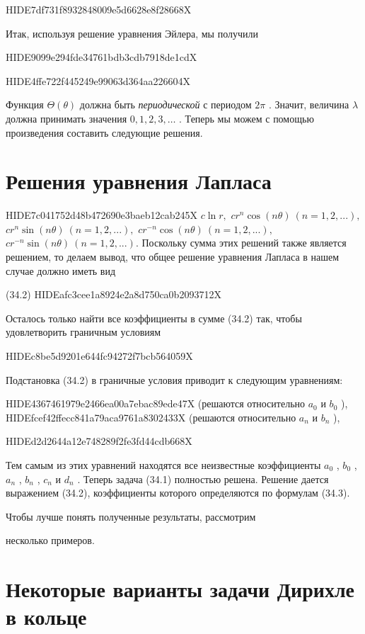 \documentclass[
  ukrainian,
]{article}
\begin{document}
HIDE7df731f8932848009e5d6628e8f28668X

Итак, используя решение уравнения Эйлера, мы получили

HIDE9099e294fde34761bdb3cdb7918de1cdX

HIDE4ffe722f445249e99063d364aa226604X

Функция \(\Theta(\theta)\) должна быть \emph{периодической} с периодом
\(2\pi\) . Значит, величина \(\lambda\) должна принимать значения
\(0, 1, 2, 3, \ldots\) . Теперь мы можем с помощью произведения
составить следующие решения.

\section{Решения уравнения
Лапласа}\label{ux440ux435ux448ux435ux43dux438ux44f-ux443ux440ux430ux432ux43dux435ux43dux438ux44f-ux43bux430ux43fux43bux430ux441ux430}

HIDE7c041752d48b472690e3baeb12cab245X \(c \ln r,\)
\(cr^n \cos(n\theta) \ (n = 1, 2, ...),\)
\(cr^n \sin(n\theta) \ (n = 1, 2, ...),\)
\(cr^{-n} \cos(n\theta) \ (n = 1, 2, ...),\)
\(cr^{-n} \sin(n\theta) \ (n = 1, 2, ...).\) Поскольку сумма этих
решений также является решением, то делаем вывод, что общее решение
уравнения Лапласа в нашем случае должно иметь вид

(34.2) HIDEafc3cee1a8924e2a8d750ca0b2093712X

Осталось только найти все коэффициенты в сумме (34.2) так, чтобы
удовлетворить граничным условиям

HIDEc8be5d9201e644fc94272f7bcb564059X

Подстановка (34.2) в граничные условия приводит к следующим уравнениям:

HIDE4367461979e2466ea00a7ebac89ede47X (решаются относительно \(a_0\) и
\(b_0\) ), HIDEfcef42ffecc841a79aca9761a8302433X (решаются относительно
\(a_n\) и \(b_n\) ),

HIDEd2d2644a12e748289f2fe3fd44cdb668X

Тем самым из этих уравнений находятся все неизвестные коэффициенты
\(a_0\) , \(b_0\) , \(a_n\) , \(b_n\) , \(c_n\) и \(d_n\) . Теперь
задача (34.1) полностью решена. Решение дается выражением (34.2),
коэффициенты которого определяются по формулам (34.3).

Чтобы лучше понять полученные результаты, рассмотрим

несколько примеров.

\section{Некоторые варианты задачи Дирихле в
кольце}\label{ux43dux435ux43aux43eux442ux43eux440ux44bux435-ux432ux430ux440ux438ux430ux43dux442ux44b-ux437ux430ux434ux430ux447ux438-ux434ux438ux440ux438ux445ux43bux435-ux432-ux43aux43eux43bux44cux446ux435}
\end{document}
